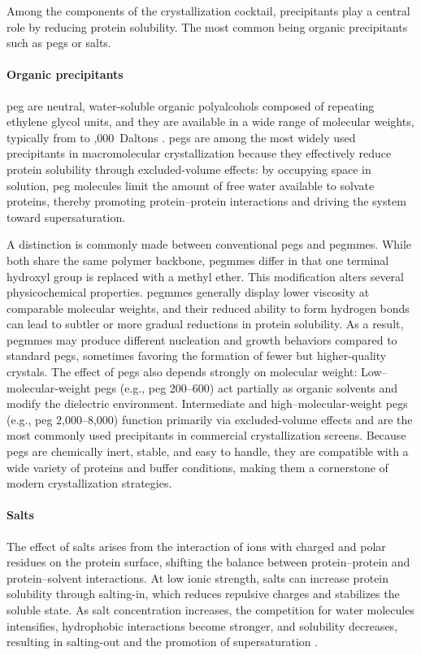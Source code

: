 Among the components of the crystallization cocktail, precipitants play a central role by reducing protein solubility. The most common being organic precipitants such as \glspl{peg} or salts. 

\paragraph{Organic precipitants}
\gls{peg} are neutral, water-soluble organic polyalcohols composed of repeating ethylene glycol units, and they are available in a wide range of molecular weights, typically from  to ,000~Daltons \parencite{Rupp2009}. \glspl{peg} are among the most widely used precipitants in macromolecular crystallization because they effectively reduce protein solubility through excluded-volume effects: by occupying space in solution, \gls{peg} molecules limit the amount of free water available to solvate proteins, thereby promoting protein–protein interactions and driving the system toward supersaturation.

A distinction is commonly made between conventional \glspl{peg} and \glspl{pegmme}. While both share the same polymer backbone, \glspl{pegmme} differ in that one terminal hydroxyl group is replaced with a methyl ether. This modification alters several physicochemical properties. \glspl{pegmme} generally display lower viscosity at comparable molecular weights, and their reduced ability to form hydrogen bonds can lead to subtler or more gradual reductions in protein solubility. As a result, \glspl{pegmme} may produce different nucleation and growth behaviors compared to standard \glspl{peg}, sometimes favoring the formation of fewer but higher-quality crystals. 
The effect of \glspl{peg} also depends strongly on molecular weight: Low–molecular-weight \glspl{peg} (e.g., \gls{peg} 200–600) act partially as organic solvents and modify the dielectric environment. Intermediate and high–molecular-weight \glspl{peg} (e.g., \gls{peg} 2,000–8,000) function primarily via excluded-volume effects and are the most commonly used precipitants in commercial crystallization screens.
Because \glspl{peg} are chemically inert, stable, and easy to handle, they are compatible with a wide variety of proteins and buffer conditions, making them a cornerstone of modern crystallization strategies.\\

\paragraph{Salts}
The effect of salts arises from the interaction of ions with charged and polar residues on the protein surface, shifting the balance between protein–protein and protein–solvent interactions. At low ionic strength, salts can increase protein solubility through salting-in, which reduces repulsive charges and stabilizes the soluble state. As salt concentration increases, the competition for water molecules intensifies, hydrophobic interactions become stronger, and solubility decreases, resulting in salting-out and the promotion of supersaturation \parencite{Rupp2009}.

